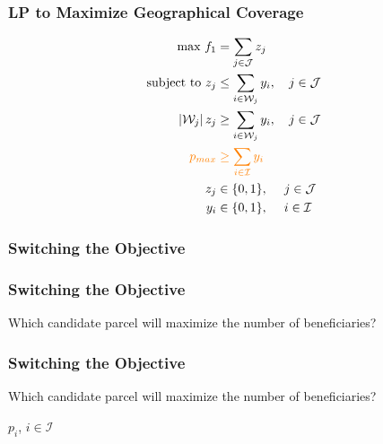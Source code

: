 \documentclass[10pt, compress]{beamer}
\begin{document}
\begin{frame}[fragile]
\frametitle{LP to Maximize Geographical Coverage}
\noindent{}
\begin{align*}
\textrm{max } f_1 &= \sum_{j \in \mathcal{J}} z_j \\
\textrm{subject to } z_j &\leq \sum_{i \in \mathcal{W}_j} y_i, \quad j \in \mathcal{J}\\
\left|\mathcal{W}_j\right|z_j &\geq \sum_{i \in \mathcal{W}_j} y_i, \quad j \in \mathcal{J} \\
\color{orange} p_{max} & \color{orange} \geq \sum_{i \in \mathcal{I}} y_i  \\
z_j &\in \{0,1\}, \quad \; j \in \mathcal{J} \\
y_i &\in \{0,1\}, \quad \; i \in \mathcal{I}
\end{align*}
\end{frame}


\begin{frame}[fragile]
\frametitle{Switching the Objective}
\begin{center}
\end{center}
\end{frame}


\begin{frame}[fragile]
\frametitle{Switching the Objective}
\begin{center}
\end{center}
\begin{block}{Which candidate parcel will maximize the number of beneficiaries?}
\end{block}
\end{frame}

\begin{frame}[fragile]
\frametitle{Switching the Objective}
\begin{center}
\end{center}
\begin{block}{Which candidate parcel will maximize the number of beneficiaries?}
\end{block}
\alert{$p_i$, \; $i \in \mathcal{I}$}
\end{frame}
\end{document}
